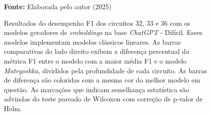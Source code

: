 \begin{figure}
\caption{Resultados do desempenho F1 dos circuitos 32, 33 e 36 com os modelos geradores de \textit{embeddings} na base \textit{ChatGPT} - Difícil. Esses modelos implementam modelos clássicos lineares. As barras comparativas do lado direito exibem a diferença percentual da métrica F1 entre o modelo com a maior média F1 e o modelo \textit{Matryoshka}, divididos pela profundidade de cada circuito. As barras de diferença são coloridas com a mesma cor do melhor modelo em questão. As marcações que indicam semelhança estatística são advindas do teste pareado de Wilcoxon com correção de p-valor de Holm.}
\label{fig:model_transformer:hard:g4}
     \centering
    \centering

      \par\medskip\ABNTEXfontereduzida\selectfont\textbf{Fonte:} Elaborada pelo autor (2025) \par\medskip
\end{figure}